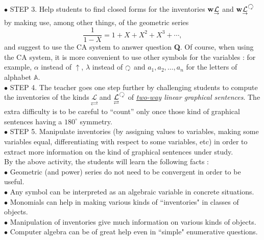 \documentclass{article}
\begin{document}
\noindent $\bullet$ STEP 3. Help students to find closed forms for the inventories ${\bf{w}}\underset{\raisebox{0.4ex}{$\scriptstyle \rightarrow $}}{\mathcal{L}}$ and ${\bf{w}}\underset{\raisebox{0.4ex}{$\scriptstyle \rightarrow $}}{\mathcal{L}}^{\rotatebox[origin=c]{-180}{$\circlearrowright$}}$ by making use, among other things, of the geometric series
\begin{equation}
\frac{1}{1-X} = 1+X+X^2+X^3+\cdots,
\end{equation}
and suggest to use the CA system to answer question {\bf{Q}}. Of course, when using the CA system, it is more convenient to use other symbols for the variables : for example, $\alpha$ instead of $\uparrow$, $\lambda$ instead of ${\rotatebox[origin=c]{-180}{$\circlearrowright$}}$ and $a_1,a_2, \dots, a_n$ for the letters of alphabet $\mathbb{A}$. \\

\noindent $\bullet$ STEP 4. The teacher goes one step further by challenging students to compute the inventories of the kinds $\underset{\rightleftarrows}{\mathcal{L}}$ and  $\underset{\rightleftarrows}{\mathcal{L}}^{\rotatebox[origin=c]{-180}{$\circlearrowright$}}$ of {\emph{{\underline{two-way}} linear graphical sentences}}. The extra difficulty is to be careful to ``count'' only once those kind of graphical sentences having a $180^\circ$ symmetry.\\

\noindent $\bullet$ STEP 5. Manipulate inventories (by assigning values to variables, making some variables equal, differentiating with respect to some variables, etc) in order to extract more information on the kind of graphical sentences under study.\\

\noindent By the above activity, the students will learn the following facts :\\

\noindent $\bullet$ Geometric (and power) series do not need to be convergent in order to be useful.\\
$\bullet$ Any symbol can be interpreted as an algebraic variable in concrete situations.\\
$\bullet$ Monomials can help in making various kinds of ``inventories" in classes of objects.\\
$\bullet$ Manipulation of inventories give much information on various kinds of objects.\\
$\bullet$ Computer algebra can be of great help even in ``simple" enumerative questions.\\
\end{document}

